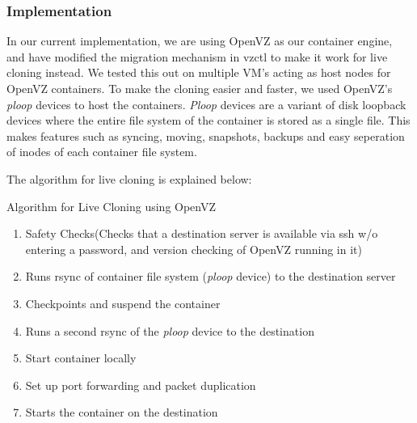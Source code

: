 \subsubsection{Implementation}
In our current implementation, we are using OpenVZ\cite{openvz} as our container engine, and have modified the migration mechanism in vzctl \cite{vzctl} to make it work for live cloning instead. 
We tested this out on multiple VM's acting as host nodes for OpenVZ containers. 
To make the cloning easier and faster, we used OpenVZ's \textit{ploop} devices \cite{ploop} to host the containers. 
\textit{Ploop} devices are a variant of disk loopback devices where the entire file system of the container is stored as a single file. 
This makes features such as syncing, moving, snapshots, backups and easy seperation of inodes of each container file system.

The algorithm for live cloning is explained below: 

\begin{algorithm}[ht]
   \caption{Algorithm for Live Cloning using OpenVZ 
   \label{algCloning}}
 \begin{enumerate}
   \item Safety Checks(Checks that a destination server is available via ssh w/o entering a password, and version checking of OpenVZ running in it) 
   \item Runs rsync of container file system (\textit{ploop} device) to the destination server  
   \item Checkpoints and suspend the container 
   \item Runs a second rsync of the \textit{ploop} device to the destination  
   \item Start container locally 
   \item Set up port forwarding and packet duplication
   \item Starts the container on the destination 
  \end{enumerate}
\end{algorithm}


